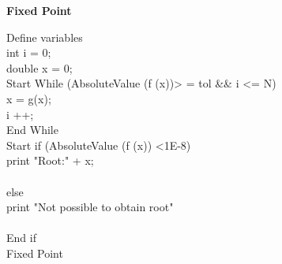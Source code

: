 \documentclass[letterpaper,12pt]{article}
\begin{document}
\BlankLine
\BlankLine

\textbf{Fixed Point}
\IncMargin{1em}
\begin{algorithm}
\BlankLine
         Define variables\\
              int i = 0;\\
              double x = 0;\\

         Start While (AbsoluteValue (f (x))> = tol && i <= N)\\
             x = g(x);\\
             i ++;\\
         End While\\

         Start if (AbsoluteValue (f (x)) <1E-8) {\\
             print "Root:" + x;\\
         }\\
         else {\\
             print "Not possible to obtain root"\\
         }\\
         End if\\
\caption{Fixed Point}
\end{algorithm}\DecMargin{1em}
\end{document}
